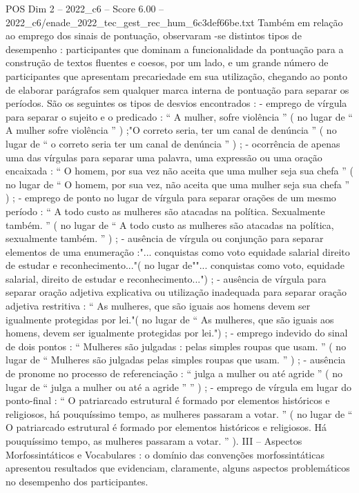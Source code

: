 \begin{textsample}{POS Dim 2 – 2022\_c6 – Score 6.00 – 2022\_c6/enade\_2022\_tec\_gest\_rec\_hum\_6c3def66be.txt}
Também em relação ao emprego dos sinais de pontuação, observaram -se distintos tipos de desempenho : participantes que dominam a funcionalidade da pontuação para a construção de textos fluentes e coesos, por um lado, e um grande número de participantes que apresentam precariedade em sua utilização, chegando ao ponto de elaborar parágrafos sem qualquer marca interna de pontuação para separar os períodos.
São os seguintes os tipos de desvios encontrados : - emprego de vírgula para separar o sujeito e o predicado : “ A mulher, sofre violência ” ( no lugar de “ A mulher sofre violência ” ) ;"O correto seria, ter um canal de denúncia ” ( no lugar de “ o correto seria ter um canal de denúncia ” ) ; - ocorrência de apenas uma das vírgulas para separar uma palavra, uma expressão ou uma oração encaixada : “ O homem, por sua vez não aceita que uma mulher seja sua chefa ” ( no lugar de “ O homem, por sua vez, não aceita que uma mulher seja sua chefa ” ) ; - emprego de ponto no lugar de vírgula para separar orações de um mesmo período : “ A todo custo as mulheres são atacadas na política.
Sexualmente também. ” ( no lugar de “ A todo custo as mulheres são atacadas na política, sexualmente também. ” ) ; - ausência de vírgula ou conjunção para separar elementos de uma enumeração :"... conquistas como voto equidade salarial direito de estudar e reconhecimento..."( no lugar de""... conquistas como voto, equidade salarial, direito de estudar e reconhecimento...") ; - ausência de vírgula para separar oração adjetiva explicativa ou utilização inadequada para separar oração adjetiva restritiva : “ As mulheres, que são iguais aos homens devem ser igualmente protegidas por lei."( no lugar de “ As mulheres, que são iguais aos homens, devem ser igualmente protegidas por lei.") ; - emprego indevido do sinal de dois pontos : “ Mulheres são julgadas : pelas simples roupas que usam. ” ( no lugar de “ Mulheres são julgadas pelas simples roupas que usam. ” ) ; - ausência de pronome no processo de referenciação : “ julga a mulher ou até agride ” ( no lugar de “ julga a mulher ou até a agride ” ” ) ; - emprego de vírgula em lugar do ponto-final : “ O patriarcado estrutural é formado por elementos históricos e religiosos, há pouquíssimo tempo, as mulheres passaram a votar. ” ( no lugar de “ O patriarcado estrutural é formado por elementos históricos e religiosos.
Há pouquíssimo tempo, as mulheres passaram a votar. ” ).
III – Aspectos Morfossintáticos e Vocabulares : o domínio das convenções morfossintáticas apresentou resultados que evidenciam, claramente, alguns aspectos problemáticos no desempenho dos participantes.

\end{textsample}
